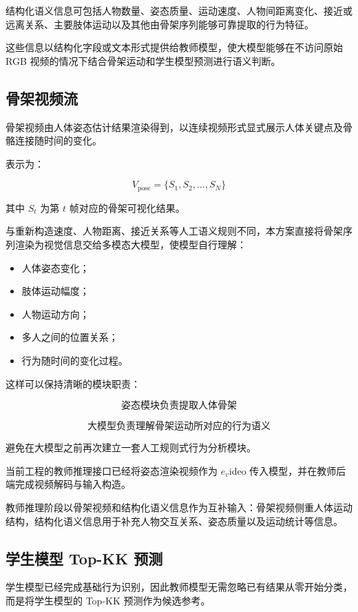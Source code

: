 结构化语义信息可包括人物数量、姿态质量、运动速度、人物间距离变化、接近或远离关系、主要肢体运动以及其他由骨架序列能够可靠提取的行为特征。

这些信息以结构化字段或文本形式提供给教师模型，使大模型能够在不访问原始 RGB 视频的情况下结合骨架运动和学生模型预测进行语义判断。

\subsection{骨架视频流}

骨架视频由人体姿态估计结果渲染得到，以连续视频形式显式展示人体关键点及骨骼连接随时间的变化。

表示为：

\[
V_{\mathrm{pose}}
=
\{
S_1,S_2,\ldots,S_N
\}
\]

其中 \(S_t\) 为第 \(t\) 帧对应的骨架可视化结果。

与重新构造速度、人物距离、接近关系等人工语义规则不同，本方案直接将骨架序列渲染为视觉信息交给多模态大模型，使模型自行理解：

\begin{itemize}
\item 人体姿态变化；
\item 肢体运动幅度；
\item 人物运动方向；
\item 多人之间的位置关系；
\item 行为随时间的变化过程。
\end{itemize}

这样可以保持清晰的模块职责：

\[
\boxed{
\text{姿态模块负责提取人体骨架}
}
\]

\[
\boxed{
\text{大模型负责理解骨架运动所对应的行为语义}
}
\]

避免在大模型之前再次建立一套人工规则式行为分析模块。

当前工程的教师推理接口已经将姿态渲染视频作为 \(e_v\)ideo 传入模型，并在教师后端完成视频解码与输入构造。

教师推理阶段以骨架视频和结构化语义信息作为互补输入：骨架视频侧重人体运动结构，结构化语义信息用于补充人物交互关系、姿态质量以及运动统计等信息。

\subsection{学生模型 Top-KK 预测}

学生模型已经完成基础行为识别，因此教师模型无需忽略已有结果从零开始分类，而是将学生模型的 Top-KK 预测作为候选参考。

